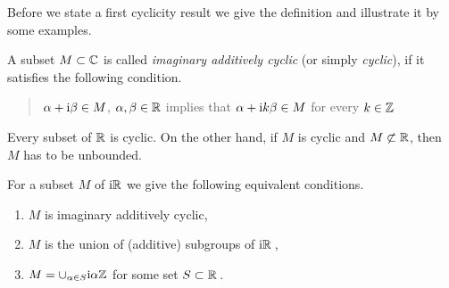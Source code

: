Before we state a first cyclicity result we give the definition and illustrate it by some examples.
\begin{definition}\label{def:b3-2.5}
A subset $M \subset \mathbb{C}$ is called \emph{imaginary additively cyclic} (or simply \emph{cyclic}), if it satisfies the following condition. 
\begin{quote}
$\alpha + \mathrm{i}\beta \in M$, $\alpha,\beta \in \mathbb{R}$ implies that $\alpha +  \mathrm{i} k\beta \in M$ for every $k \in \mathbb{Z}$\,
\end{quote}
\end{definition}
Every subset of $\mathbb{R}$ is cyclic. 
On the other hand, if $M$ is cyclic and $M \not\subset \mathbb{R}$, then $M$ has to be unbounded.
	
For a subset $M$ of $\mathrm{i} \mathbb{R}$ we give the following equivalent conditions.
	\begin{enumerate}[\upshape (a)]
		\item 
		$M$ is imaginary additively cyclic,
		
		\item 
		$M$ is the union of (additive) subgroups of $\mathrm{i} \mathbb{R}$\,,
		
		\item 
		$M = \cup_{\alpha \in S} \mathrm{i}\alpha\mathbb{Z}$ for some set $S \subset \mathbb{R}$\,.
	\end{enumerate}
	
